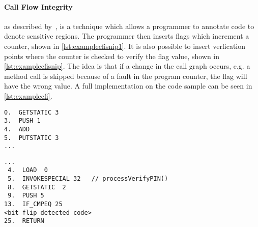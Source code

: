 \paragraph{Call Flow Integrity} as described by~\cite{agl}, is a technique which allows a programmer to annotate code to denote sensitive regions. The programmer then inserts flags which increment a counter, shown in \cref{lst:examplecfisnip1}. It is also possible to insert verfication points where the counter is checked to verify the flag value, shown in \cref{lst:examplecfisnip}. The idea is that if a change in the call graph occurs, e.g. a method call is skipped because of a fault in the program counter, the flag will have the wrong value. A full implementation on the code sample can be seen in \cref{lst:examplecfi}.

\begin{lstlisting}[caption={Java code example of the control flow integrity countermeasure incrementing the control flow flag},label={lst:examplecfisnip1}]
0.  GETSTATIC 3
3.  PUSH 1
4.  ADD
5.  PUTSTATIC 3
...
\end{lstlisting}

\begin{lstlisting}[caption={Java code example of the control flow integrity countermeasure checking the control flow flag},label={lst:examplecfisnip}]
...
 4.  LOAD  0
 5.  INVOKESPECIAL 32   // processVerifyPIN()
 8.  GETSTATIC  2
 9.  PUSH 5
13.  IF_CMPEQ 25
<bit flip detected code>
25.  RETURN
\end{lstlisting}



